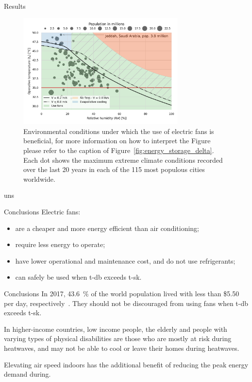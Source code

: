 \documentclass[aspectratio=169]{beamer}
\begin{document}
    \begin{frame}{Results}
        \begin{figure}[thb!]
            \centering
            \includegraphics[width=0.75\textwidth]{figures/use_fans_and_population}
            \caption{Environmental conditions under which the use of electric fans is beneficial, for more information on how to interpret the Figure please refer to the caption of Figure~\ref{fig:energy_storage_delta}.
            Each dot shows the maximum extreme climate conditions recorded over the last 20 years in each of the 115 most populous cities worldwide.}
            \label{fig:use_fans_and_population}
        \end{figure}
    \end{frame}uns

    \begin{frame}{Conclusions}
        Electric fans:
        \begin{itemize}
            \item are a cheaper and more energy efficient than air conditioning;
            \item require less energy to operate;
            \item have lower operational and maintenance cost, and do not use refrigerants;
            \item can safely be used when \ac{t-db} exceeds \ac{t-sk}.
        \end{itemize}
    \end{frame}

    \begin{frame}{Conclusions}
        In 2017, 43.6~\% of the world population lived with less than \$5.50 per day, respectively~\cite{PovertyO1:online}.
        They should not be discouraged from using fans when \ac{t-db} exceeds \ac{t-sk}.

        In higher-income countries, low income people, the elderly and people with varying types of physical disabilities are those who are mostly at risk during heatwaves, and may not be able to cool or leave their homes during heatwaves.

        Elevating air speed indoors has the additional benefit of reducing the peak energy demand during.
    \end{frame}
\end{document}
